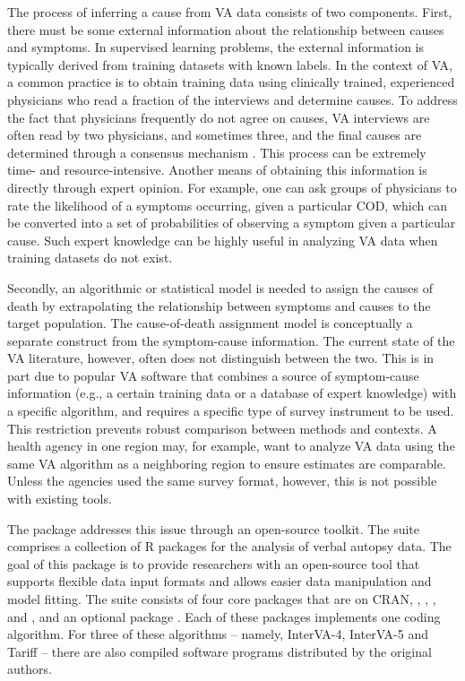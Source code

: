 The process of inferring a cause from VA data consists of two
components. First, there must be some external information about the
relationship between causes and symptoms. In supervised learning
problems, the external information is typically derived from training
datasets with known labels. In the context of VA, a common practice is
to obtain training data using clinically trained, experienced physicians
who read a fraction of the interviews and determine causes. To address
the fact that physicians frequently do not agree on causes, VA
interviews are often read by two physicians, and sometimes three, and
the final causes are determined through a consensus mechanism
\citep[e.g.,][]{kahn2012profile}. This process can be extremely time-
and resource-intensive. Another means of obtaining this information is
directly through expert opinion. For example, one can ask groups of
physicians to rate the likelihood of a symptoms occurring, given a
particular COD, which can be converted into a set of probabilities of
observing a symptom given a particular cause. Such expert knowledge can
be highly useful in analyzing VA data when training datasets do not
exist.

Secondly, an algorithmic or statistical model is needed to assign the
causes of death by extrapolating the relationship between symptoms and
causes to the target population. The cause-of-death assignment model is
conceptually a separate construct from the symptom-cause information.
The current state of the VA literature, however, often does not
distinguish between the two. This is in part due to popular VA software
that combines a source of symptom-cause information (e.g., a certain
training data or a database of expert knowledge) with a specific
algorithm, and requires a specific type of survey instrument to be used.
This restriction prevents robust comparison between methods and
contexts. A health agency in one region may, for example, want to
analyze VA data using the same VA algorithm as a neighboring region to
ensure estimates are comparable. Unless the agencies used the same
survey format, however, this is not possible with existing tools.

The  package \citep{openvapkg} addresses this issue
through an open-source toolkit. The  suite comprises a
collection of R packages for the analysis of verbal autopsy data. The
goal of this package is to provide researchers with an open-source tool
that supports flexible data input formats and allows easier data
manipulation and model fitting. The  suite consists of
four core packages that are on CRAN, 
\citep{interVA4},  \citep{interVA5},
 \citep{insilicovapkg}, and 
\citep{tariffpkg}, and an optional package  \citep{nbcpkg}.
Each of these packages implements one coding algorithm. For three of
these algorithms -- namely, InterVA-4, InterVA-5 and Tariff -- there are
also compiled software programs distributed by the original authors.

